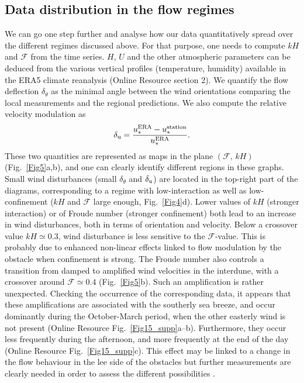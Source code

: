 \subsection{Data distribution in the flow regimes}
We can go one step further and analyse how our data quantitatively spread over the different regimes discussed above. For that purpose, one needs to compute $kH$ and $\mathcal{F}$ from the time series. $H$, $U$ and the other atmospheric parameters can be deduced from the various vertical profiles (temperature, humidity) available in the ERA5 climate reanalysis (Online Resource section 2). We quantify the flow deflection $\delta_{\theta}$ as the minimal angle between the wind orientations comparing the local measurements and the regional predictions. We also compute the relative velocity modulation as
%
\begin{equation}
\delta_{\textup{u}} = \frac{u_{*}^{\textup{ERA}} -  u_{*}^{\textup{station}}}{u_{*}^{\textup{ERA}}}.
\end{equation}
%
These two quantities are represented as maps in the plane $(\mathcal{F}, \, kH)$ (Fig.~\ref{Fig5}a,b), and one can clearly identify different regions in these graphs. Small wind disturbances (small $\delta_{\theta}$ and $\delta_{\textup{u}}$) are located in the top-right part of the diagrams, corresponding to a regime with low-interaction as well as low-confinement ($k H$ and $\mathcal{F}$ large enough, Fig.~\ref{Fig4}d). Lower values of $k H$ (stronger interaction) or of Froude number (stronger confinement) both lead to an increase in wind disturbances, both in terms of orientation and velocity. Below a crossover value $k H \simeq 0.3$, wind disturbance is less sensitive to the $\mathcal{F}$-value. This is probably due to enhanced non-linear effects linked to flow modulation by the obstacle when confinement is strong. The Froude number also controls a transition from damped to amplified wind velocities in the interdune, with a crossover around $\mathcal{F} \simeq 0.4$ (Fig.~\ref{Fig5}b). Such an amplification is rather unexpected. Checking the occurrence of the corresponding data, it appears that these amplifications are associated with the southerly sea breeze, and occur dominantly during the October-March period, when the other easterly wind is not present (Online Resource Fig.~\ref{Fig15_supp}a--b). Furthermore, they occur less frequently during the afternoon, and more frequently at the end of the day (Online Resource Fig.~\ref{Fig15_supp}c). This effect may be linked to a change in the flow behaviour in the lee side of the obstacles but further measurements are clearly needed in order to assess the different possibilities \citep{baines1995, Vosper2004}.


